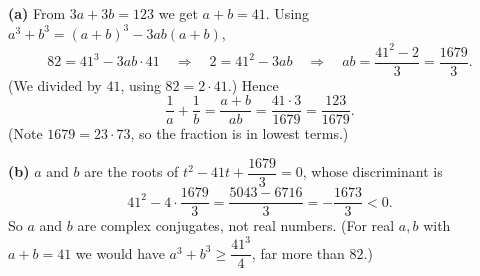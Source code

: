 \textbf{(a)} From $3a+3b=123$ we get $a+b=41$. Using $a^3+b^3=(a+b)^3-3ab(a+b)$,
\[82=41^3-3ab\cdot41\quad\Longrightarrow\quad 2=41^2-3ab\quad\Longrightarrow\quad ab=\dfrac{41^2-2}{3}=\dfrac{1679}{3}.\]
(We divided by $41$, using $82=2\cdot41$.) Hence
\[\dfrac{1}{a}+\dfrac{1}{b}=\dfrac{a+b}{ab}=\dfrac{41\cdot3}{1679}=\boxed{\dfrac{123}{1679}}.\]
(Note $1679=23\cdot73$, so the fraction is in lowest terms.)

\textbf{(b)} $a$ and $b$ are the roots of $t^2-41t+\dfrac{1679}{3}=0$, whose discriminant is
\[41^2-4\cdot\dfrac{1679}{3}=\dfrac{5043-6716}{3}=-\dfrac{1673}{3}<0 .\]
So $a$ and $b$ are complex conjugates, not real numbers. (For real $a,b$ with $a+b=41$ we would have $a^3+b^3\ge\dfrac{41^3}{4}$, far more than $82$.)
